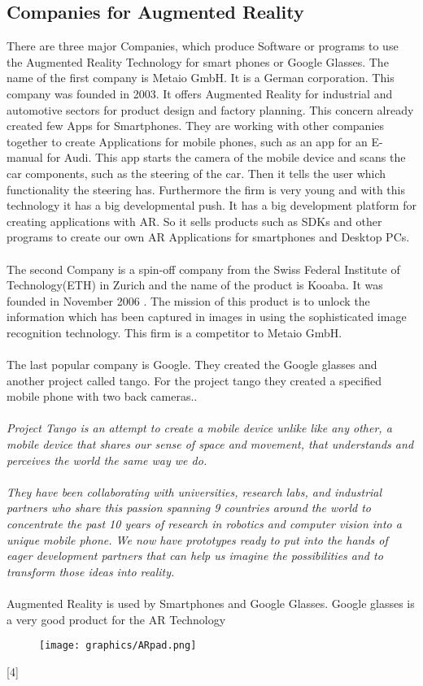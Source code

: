  \subsection{Companies for Augmented Reality}
 There are three major Companies, which produce Software or programs to use the Augmented Reality Technology for smart phones or Google Glasses.  The name of the first company is Metaio GmbH. It is a German corporation. This company was founded in 2003. It offers Augmented Reality for industrial and automotive sectors for product design and factory planning. This concern already created few Apps for Smartphones. They are working with other companies together to create Applications for mobile phones, such as an app for an E-manual for  Audi. This app  starts the camera of the mobile device and scans the car components, such as the steering of the car. Then it tells the user which functionality the steering has. Furthermore the firm is very young and with this technology it has a big developmental push. It has a big development platform for creating applications with AR. So it sells products such as SDKs and other programs to create our own AR Applications for smartphones and Desktop PCs.
 \\
 \\
 The second Company is a spin-off company from the Swiss Federal Institute of Technology(ETH) in Zurich and the name of  the product is Kooaba. It was founded  in November 2006 . The mission of this product is to unlock the information which has been captured in images in using the sophisticated image recognition technology. This firm is a competitor to Metaio GmbH.
 \\
 \\ 
 The last popular company is Google. They created the Google glasses and another project called tango.  For the project tango they created a specified mobile phone with two back cameras..
 \\
 \\
 
 \textit{ Project Tango is an attempt to create a mobile device unlike like any other, a mobile device that shares our sense of space and movement, that understands and perceives the world the same way we do.\cite{Tango}}
 \\
 \\
 \textit{
 They have been collaborating with universities, research labs, and industrial partners who share this passion spanning 9 countries around the world to concentrate the past 10 years of research in robotics and computer vision into a unique mobile phone. We now have prototypes ready to put into the hands of eager development partners that can help us imagine the possibilities and to transform those ideas into reality.\cite{Tango}
 }
 \\
 \\
 Augmented Reality is used by Smartphones and Google Glasses. Google glasses is a very good product for the AR Technology
 \begin{figure}[htbp]
 \centering
 \texttt{[image: graphics/ARpad.png]}
 \caption{\cite{ARpad}}
 \end{figure}
 [4]\\
 \\

